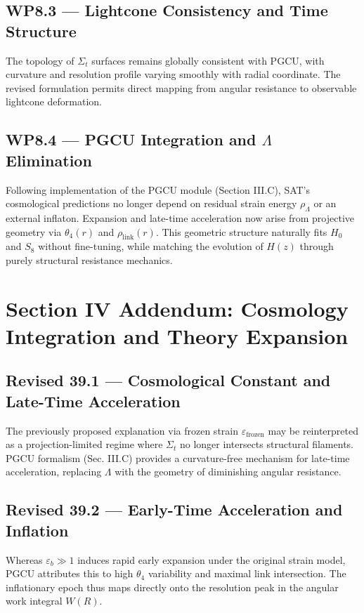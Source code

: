 \subsection*{WP8.3 — Lightcone Consistency and Time Structure}
The topology of $\Sigma_t$ surfaces remains globally consistent with PGCU, with curvature and resolution profile varying smoothly with radial coordinate. The revised formulation permits direct mapping from angular resistance to observable lightcone deformation.

\subsection*{WP8.4 — PGCU Integration and $\Lambda$ Elimination}
Following implementation of the PGCU module (Section III.C), SAT’s cosmological predictions no longer depend on residual strain energy $\rho_\Lambda$ or an external inflaton. Expansion and late-time acceleration now arise from projective geometry via $\theta_4(r)$ and $\rho_{\text{link}}(r)$. This geometric structure naturally fits $H_0$ and $S_8$ without fine-tuning, while matching the evolution of $H(z)$ through purely structural resistance mechanics.

\bigskip

\section*{Section IV Addendum: Cosmology Integration and Theory Expansion}

\subsection*{Revised 39.1 — Cosmological Constant and Late-Time Acceleration}
The previously proposed explanation via frozen strain $\varepsilon_{\text{frozen}}$ may be reinterpreted as a projection-limited regime where $\Sigma_t$ no longer intersects structural filaments. PGCU formalism (Sec. III.C) provides a curvature-free mechanism for late-time acceleration, replacing $\Lambda$ with the geometry of diminishing angular resistance.

\subsection*{Revised 39.2 — Early-Time Acceleration and Inflation}
Whereas $\varepsilon_b \gg 1$ induces rapid early expansion under the original strain model, PGCU attributes this to high $\theta_4$ variability and maximal link intersection. The inflationary epoch thus maps directly onto the resolution peak in the angular work integral $W(R)$.

